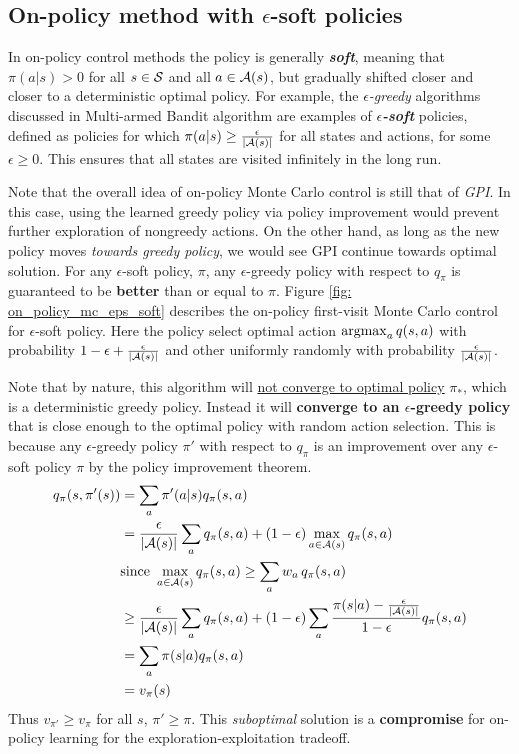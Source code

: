\documentclass[11pt]{article}
\begin{document}
\subsection{On-policy method with $\epsilon$-soft policies}
In on-policy control methods the policy is generally \emph{\textbf{soft}}, meaning that  $\pi(a|s) > 0$ for all $s \in {\mathcal S}$ and all $a \in {\mathcal A}(s)$, but gradually shifted closer and closer to a deterministic optimal policy. For example, the \emph{$\epsilon$-greedy} algorithms discussed in Multi-armed Bandit algorithm  are examples of \emph{\textbf{$\epsilon$-soft}} policies, defined as policies for which $\pi(a|s) \ge \frac{\epsilon}{|{\mathcal A}(s)|}$ for all states and actions, for some $\epsilon \ge 0$. This ensures that all states are visited infinitely in the long run. 

Note that the overall idea of on-policy Monte Carlo control is still that of \emph{GPI}. In this case, using the learned greedy policy via policy improvement would prevent further exploration of nongreedy actions.  On the other hand, as long as the new policy moves \emph{towards greedy policy}, we would see GPI continue towards optimal solution.  For any $\epsilon$-soft policy, $\pi$, any $\epsilon$-greedy policy with respect to $q_{\pi}$ is guaranteed to be \textbf{better} than or equal to $\pi$. Figure \ref{fig: on_policy_mc_eps_soft} describes the on-policy first-visit Monte Carlo control for $\epsilon$-soft policy. Here the policy select optimal action $\operatorname{argmax}_{a}q(s,a)$ with probability $1-\epsilon+\frac{\epsilon}{|{\mathcal A}(s)|}$ and other uniformly randomly with probability $\frac{\epsilon}{|{\mathcal A}(s)|}$.

Note that by nature, this algorithm will \underline{not converge to optimal policy} $\pi_{*}$, which is a deterministic greedy policy. Instead it will \textbf{converge to an $\epsilon$-greedy policy} that is close enough to the optimal policy with random action selection. This is because any $\epsilon$-greedy policy $\pi'$ with respect to $q_{\pi}$ is an improvement over any $\epsilon$-soft policy $\pi$ by the policy improvement theorem.  
\begin{align*}
q_{\pi}(s, \pi'(s)) &= \sum_{a}\pi'(a|s) q_{\pi}(s, a) \\
&= \frac{\epsilon}{|{\mathcal A}(s)|}\sum_{a}q_{\pi}(s, a) + (1-\epsilon)\max_{a\in {\mathcal A}(s)}q_{\pi}(s, a) \\
&\text{since }\max_{a\in {\mathcal A}(s)}q_{\pi}(s, a) \ge \sum_{a}w_a\,q_{\pi}(s, a) \\
&\ge  \frac{\epsilon}{|{\mathcal A}(s)|}\sum_{a}q_{\pi}(s, a) + (1-\epsilon)\sum_{a}\frac{\pi(s|a) -  \frac{\epsilon}{|{\mathcal A}(s)|}}{1-\epsilon}q_{\pi}(s, a) \\
&=  \sum_{a}\pi(s|a)q_{\pi}(s, a) \\
&= v_{\pi}(s)
\end{align*} Thus $v_{\pi'} \ge v_{\pi}$ for all $s$, $\pi' \ge \pi$. This \emph{suboptimal} solution is a \textbf{compromise} for on-policy learning for the exploration-exploitation tradeoff.
\end{document}
